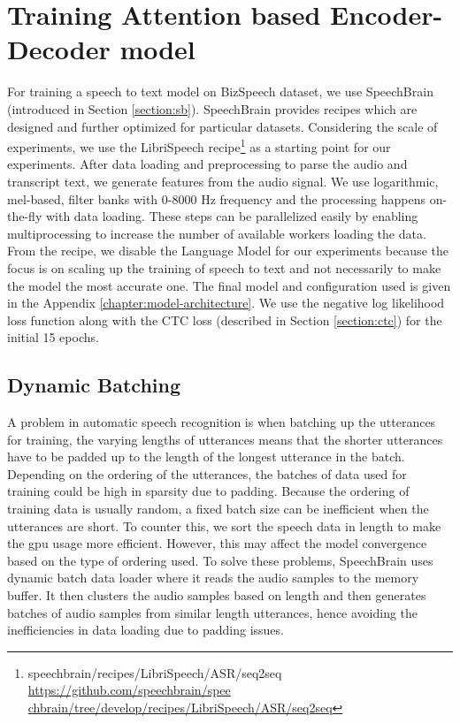 \section{Training Attention based Encoder-Decoder model}
\label{section:attention_train}
For training a speech to text model on BizSpeech dataset, we use SpeechBrain (introduced in Section \ref{section:sb}). SpeechBrain provides recipes which are designed and further optimized for particular datasets. Considering the scale of experiments, we use the LibriSpeech recipe\footnote{speechbrain/recipes/LibriSpeech/ASR/seq2seq \href{https://github.com/speechbrain/speechbrain/tree/develop/recipes/LibriSpeech/ASR/seq2seq}{https://github.com/speechbrain/spee chbrain/tree/develop/recipes/LibriSpeech/ASR/seq2seq}} as a starting point for our experiments. After data loading and preprocessing to parse the audio and transcript text, we generate features from the audio signal. We use logarithmic, mel-based, filter banks 
\cite{Vetterli1992WaveletsDesign} with  0-8000 Hz frequency and the processing happens on-the-fly with data loading. These steps can be parallelized easily by enabling multiprocessing to increase the number of available workers loading the data. From the recipe, we disable the Language Model for our experiments because the focus is on scaling up the training of speech to text and not necessarily to make the model the most accurate one. The final model and configuration used is given in the Appendix \ref{chapter:model-architecture}. We use the negative log likelihood loss function along with the CTC loss (described in Section \ref{section:ctc}) for the initial 15 epochs. 

\subsection{Dynamic Batching}
\label{section:dynbatch}
A problem in automatic speech recognition is when batching up the utterances for training, the varying lengths of utterances means that the shorter utterances have to be padded up to the length of the longest utterance in the batch. Depending on the ordering of the utterances, the batches of data used for training could be high in sparsity due to padding. Because the ordering of training data is usually random, a fixed batch size can be inefficient when the utterances are short. To counter this, we sort the speech data in length to make the \acrshort{gpu} usage more efficient. However, this may affect the model convergence based on the type of ordering used. To solve these problems, SpeechBrain uses dynamic batch data loader where it reads the audio samples to the memory buffer. It then clusters the audio samples based on length and then generates batches of audio samples from similar length utterances, hence avoiding the inefficiencies in data loading due to padding issues. 

